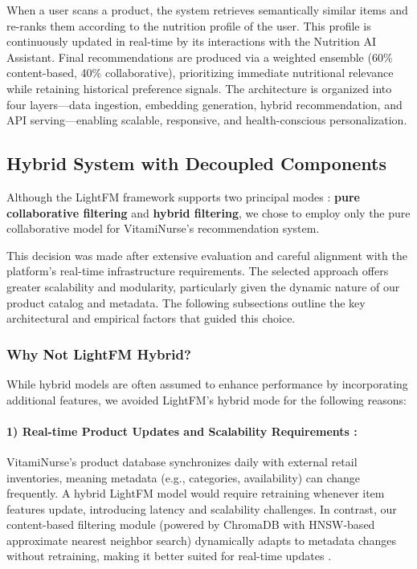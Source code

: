 \par When a user scans a product, the system retrieves semantically similar items and re-ranks them according to the nutrition profile of the user.
This profile is continuously updated in real-time by its interactions with
the Nutrition AI Assistant.
Final recommendations are produced via a weighted ensemble (60\% content-based, 40\% collaborative), prioritizing immediate nutritional
relevance while retaining historical preference signals. The architecture is
organized into four layers—data ingestion, embedding generation, hybrid
recommendation, and API serving—enabling scalable, responsive, and health-conscious personalization.


\subsection{Hybrid System with Decoupled Components}

Although the LightFM framework supports two principal modes : \textbf{pure collaborative filtering} and \textbf{hybrid filtering}, we chose to employ only the pure collaborative model for VitamiNurse’s recommendation system.

This decision was made after extensive evaluation and careful alignment with the platform’s real-time infrastructure requirements. The selected approach offers greater scalability and modularity, particularly given the dynamic nature of our product catalog and metadata. 
The following subsections outline the key architectural and empirical factors that guided this choice.


\subsubsection{Why Not LightFM Hybrid?}

While hybrid models are often assumed to enhance performance by incorporating additional features, we avoided LightFM's hybrid mode for the following reasons:

\paragraph{1) Real-time Product Updates and Scalability Requirements :}
VitamiNurse's product database synchronizes daily with external retail inventories, meaning metadata (e.g., categories, availability) can change frequently. A hybrid LightFM model would require retraining whenever item features update, introducing latency and scalability challenges. In contrast, our content-based filtering module (powered by ChromaDB with HNSW-based approximate nearest neighbor search) dynamically adapts to metadata changes without retraining, making it better suited for real-time updates \cite{chromadb}.

